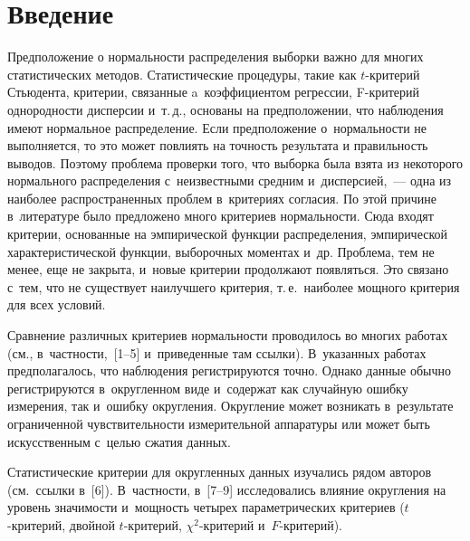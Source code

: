 


\thispagestyle{headings}

\begin{multicols}{2}

\label{st\stat}


\section{Введение}

Предположение о нормальности распределения\linebreak
 выборки  важно для многих статистических методов.
Статистические процедуры, такие как $t$-кри\-те\-рий Стьюдента, критерии, связанные a~коэффициентом регрессии,
F-кри\-те\-рий однородности \mbox{дисперсии} и~т.\,д., основаны на предположении, что наблюдения имеют нормальное
распределение. Если предположение о~нормальности не выполняется, то это может повлиять на точ\-ность результата
и правильность выводов. Поэтому проблема проверки того, что выборка была взята из некоторого нормального
распределения с~неизвестными средним и~дисперсией,~--- одна из наиболее распространенных проблем
в~критериях согласия. По этой причине в~литературе было предложено много критериев нормальности. Сюда
входят критерии, основанные на эмпирической функции распределения, эмпирической характеристической функции,
выборочных моментах и~др. Проб\-ле\-ма, тем не менее, еще не закрыта, и~новые критерии продолжают появляться.
Это связано с~тем, что не существует наилучшего критерия, т.\,е.\ наиболее мощного
критерия для всех условий.

Сравнение различных критериев нор\-маль\-ности проводилось во многих работах (см., в~част\-ности,~[1--5] 
и~приведенные там ссылки). В~указанных работах предполагалось, что наблюдения
регистрируются точно. Однако данные обычно регистрируются в~округленном виде и~содержат как случайную
ошибку измерения, так и~ошибку округления. Округление может возникать в~результате ограниченной
чувствительности измерительной аппаратуры или может быть искусственным с~целью сжатия данных.

Статистические критерии для округленных данных изучались рядом авторов (см.\ ссылки в~[6]). В~частности, в~[7--9]
исследовались влияние округления на уровень значимости и~мощность четырех параметрических критериев
($t$-кри\-те\-рий, двойной $t$-кри\-те\-рий, $\chi^2$-кри\-те\-рий и~$F$-кри\-те\-рий).


\end{multicols}
